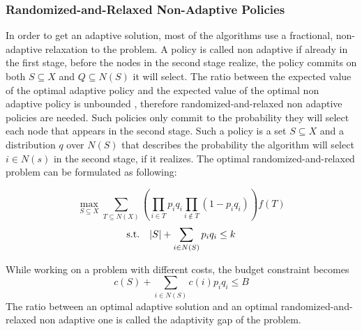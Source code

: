 \subsubsection{Randomized-and-Relaxed Non-Adaptive Policies}\label{sec:nonAdaptive}
In order to get an adaptive solution, most of the algorithms use a fractional, non-adaptive relaxation to the problem. A policy is called non adaptive if already in the first stage, before the nodes in the second stage realize, the policy commits on
both $S \subseteq X$ and $Q \subseteq N(S)$ it will select. The ratio between the expected value of the optimal adaptive policy and the expected value of the optimal non
adaptive policy is unbounded \cite{seeman2013adaptive}, therefore randomized-and-relaxed
non adaptive policies are needed. Such policies only commit to the probability they will select each node that appears in the second stage. Such a policy is a set $S \subseteq X$ and a distribution $q$ over $N(S)$ that describes the probability the algorithm will
select $i \in N(s)$ in the second stage, if it realizes. The optimal randomized-and-relaxed problem can be formulated as following:

\[\max_{S \subseteq X} \sum_{T \subseteq N(X)}{\left(\prod_{i \in T}{p_i q_i}\prod_{i \not\in T}{(1-p_i q_i)}\right)f(T)} \]
\[\textup{s.t.}\quad  |S|+ \sum_{i \in N(S)}{p_i q_i} \le k \]

While working on a problem with different costs, the budget constraint becomes 
\[ c(S) + \sum_{i \in N(S)}{c(i)p_i q_i} \leq B \]
The ratio between an optimal adaptive solution and an optimal randomized-and-relaxed non adaptive one is called the adaptivity gap of the problem.
